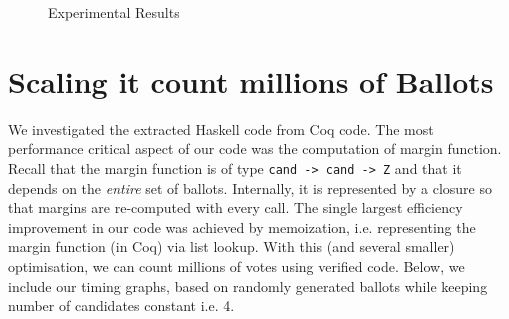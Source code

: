 \begin{figure}
\centering     %
{}
\caption{Experimental Results}
\label{fig:test}
\end{figure}

%
  
 \section{Scaling it count millions of Ballots}
 \label{sec:count_million}
 We investigated the extracted Haskell code  from Coq code.
The most performance critical aspect of our code was the computation of  margin
function. Recall that the margin function is of type
\texttt{cand -> cand -> Z}
and that it depends on the \emph{entire} set of ballots. Internally, it is
represented by a closure \citep{Landin:1964:MEE} so that margins are
re-computed with every call. The single largest efficiency
improvement in our code was achieved by memoization, i.e.
representing the margin function (in Coq) via list lookup. With
this (and several smaller) optimisation, we can count millions of
votes using verified code. Below, we include our timing graphs,
based on randomly generated ballots while keeping number of candidates
constant i.e. 4. 


